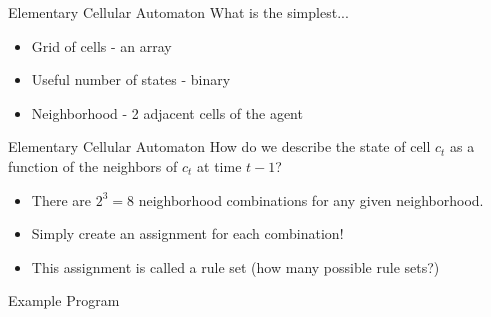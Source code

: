 \documentclass[bigger]{beamer}
\begin{document}
\begin{frame}[label=sec-10]{Elementary Cellular Automaton}
What is the simplest...
\begin{itemize}
\item<1->Grid of cells - an array
\item<1->Useful number of states - binary
\item<1->Neighborhood - 2 adjacent cells of the agent
\end{itemize}
\end{frame}

\begin{frame}[label=sec-11]{Elementary Cellular Automaton}
How do we describe the state of cell \(c_t\) as a function of the neighbors of \(c_t\) at time \(t-1\)?
\begin{itemize}
\item<1->There are \(2^3 = 8\) neighborhood combinations for any given neighborhood.
\item<2->Simply create an assignment for each combination!
\item<3->This assignment is called a rule set (how many possible rule sets?)
\end{itemize}
\end{frame}

\begin{frame}[label=sec-12]{Example Program}
\end{frame}
\end{document}
